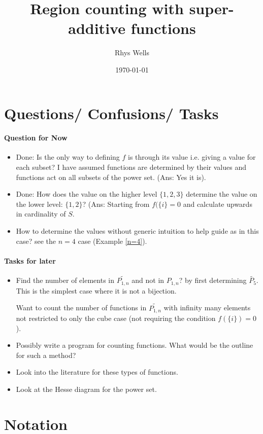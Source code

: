 \documentclass[a4paper,12pt]{article}
\title{Region counting with super-additive functions}
\author{Rhys Wells}
\date{\today}
\theoremstyle{definition}
\theoremstyle{indented}
\newenvironment{titlemize}[1]{%
  \paragraph{#1}
  \begin{itemize}}
  {\end{itemize}}
\begin{document}
\maketitle
\tableofcontents

\section{Questions/ Confusions/ Tasks}

\begin{titlemize}{Question for Now}
         \item Done: Is the only way to defining $f$ is through its value i.e. giving a value for each subset? I have assumed functions are determined by their values and functions act on all subsets of the power set. (Ans: Yes it is).
         \item Done: How does the value on the higher level $\{1,2,3\}$ determine the value on the lower level: $\{1,2\}$? (Ans: Starting from $f(\{i\}=0$ and calculate upwards in cardinality of $S$. 
\item How to determine the values without generic intuition to help guide as in this case? see the $n=4$ case (Example \ref{n=4}).

\end{titlemize}
      
      



\begin{titlemize}{Tasks for later}
\item Find the number of elements in $\tilde{P_{1,n}} $ and not in $P_{1,n}$? by first determining $\tilde{P_{5}}$. This is the simplest case where it is not a bijection.
   
    \subitem Want to count the number of functions in $\tilde{P_{1,n}}$ with infinity many elements not restricted to only the cube case (not requiring the condition $f(\{i\})=0$). 
    
        \item Possibly write a program for counting functions. What would be the outline for such a method?
        
        
\item Look into the literature for these types of functions. 
\item Look at the Hesse diagram for the power set. 
    
\end{titlemize}


\section{Notation}
\end{document}
